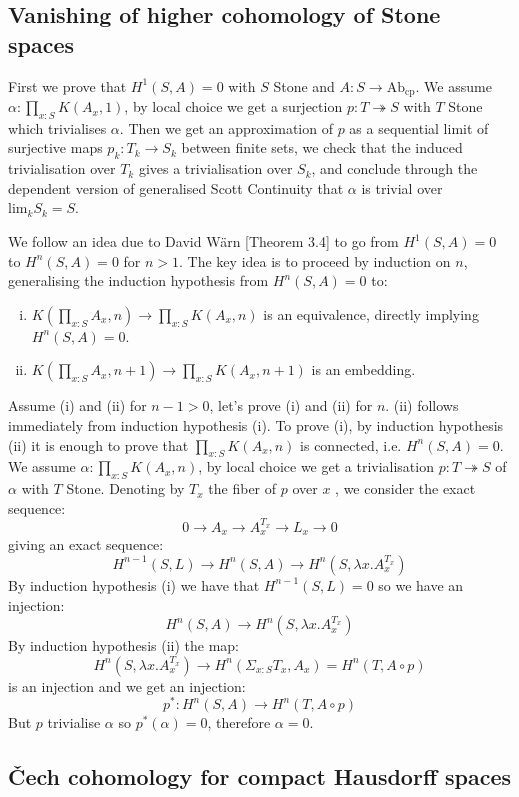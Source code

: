 \documentclass{../util/zariski}
\begin{document}
\subsection*{Vanishing of higher cohomology of Stone spaces}

First we prove that $H^1(S,A) = 0$ with $S$ Stone and  $A : S\to \mathrm{Ab}_{\mathrm{cp}}$. We assume $\alpha:\prod_{x:S}K(A_x,1)$, by local choice we get a surjection $p:T\twoheadrightarrow S$ with $T$ Stone which trivialises $\alpha$. Then we get an approximation of $p$ as a sequential limit of surjective maps $p_k:T_k\to S_k$ between finite sets, we check that the induced trivialisation over $T_k$ gives a trivialisation over $S_k$, and conclude through the dependent version of generalised Scott Continuity that $\alpha$ is trivial over $\mathrm{lim}_kS_k =S$.

We follow an idea due to David W\"arn \cite{cech-draft}[Theorem 3.4] to go from $H^1(S,A)=0$ to $H^n(S,A)=0$ for $n>1$. The key idea is to proceed by induction on $n$, generalising the induction hypothesis from $H^n(S,A) = 0$ to: 
\begin{enumerate}[(i)]
\item $K(\prod_{x:S}A_x,n) \to \prod_{x:S}K(A_x,n)$ is an equivalence, directly implying $H^n(S,A)=0$.
\item $K(\prod_{x:S}A_x,n+1) \to \prod_{x:S}K(A_x,n+1)$ is an embedding.
\end{enumerate}
Assume (i) and (ii) for $n-1>0$, let's prove (i) and (ii) for $n$. (ii) follows immediately from induction hypothesis (i). To prove (i), by induction hypothesis (ii) it is enough to prove that $\prod_{x:S}K(A_x,n)$ is connected, i.e. $H^n(S,A)=0$. We assume $\alpha:\prod_{x:S}K(A_x,n)$, by local choice we get a trivialisation $p:T\twoheadrightarrow S$ of $\alpha$ with $T$ Stone. Denoting by $T_x$ the fiber of $p$ over $x$ , we consider the exact sequence:
\[0\to A_x\to A_x^{T_x}\to L_x\to 0\]
giving an exact sequence:
\[H^{n-1}(S,L)\to H^n(S,A)\to H^n(S,\lambda x. A_x^{T_x})\]
By induction hypothesis (i) we have that $H^{n-1}(S,L) = 0$ so we have an injection:
\[H^n(S,A)\to H^n(S,\lambda x. A_x^{T_x})\]
By induction hypothesis (ii) the map: 
\[H^n(S,\lambda x. A_x^{T_x}) \to H^n(\Sigma_{x:S}T_x,A_x) = H^n(T,A\circ p)\]
is an injection and we get an injection:
\[p^* : H^n(S,A)\to H^n(T,A\circ p)\] 
But $p$ trivialise $\alpha$ so $p^*(\alpha)=0$, therefore $\alpha=0$.

\subsection*{\v{C}ech cohomology for compact Hausdorff spaces}
\end{document}
